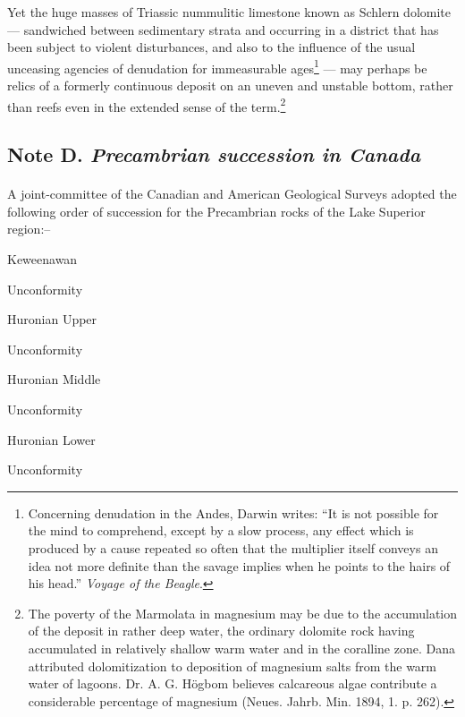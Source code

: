 \documentclass[a4paper, 12pt, oneside, landscape]{article}
\begin{document}
Yet the huge masses of Triassic nummulitic limestone known as Schlern dolomite --- sandwiched between sedimentary strata and occurring in a district that has been subject to violent disturbances, and also to the influence of the usual unceasing agencies of denudation for immeasurable ages\footnote{Concerning denudation in the Andes, Darwin writes: ``It is not possible for the mind to comprehend, except by a slow process, any effect which is produced by a cause repeated so often that the multiplier itself conveys an idea not more definite than the savage implies when he points to the hairs of his head.'' \emph{Voyage of the Beagle}.} --- may perhaps be relics of a formerly continuous deposit on an uneven and unstable bottom, rather than reefs even in the extended sense of the term.\footnote{The poverty of the Marmolata in magnesium may be due to the accumulation of the deposit in rather deep water, the ordinary dolomite rock having accumulated in relatively shallow warm water and in the coralline zone. Dana attributed dolomitization to deposition of magnesium salts from the warm water of lagoons. Dr. A. G. Högbom believes calcareous algae contribute a considerable percentage of magnesium (Neues. Jahrb. Min. 1894, 1. p. 262).}

\subsection{Note D. \emph{Precambrian succession in Canada}}
\paragraph{}
A joint-committee of the Canadian and American Geological Surveys adopted the following order of succession for the Precambrian rocks of the Lake Superior region:--

Keweenawan

\hspace{10mm}Unconformity

Huronian Upper

\hspace{10mm}Unconformity

Huronian Middle

\hspace{10mm}Unconformity

Huronian Lower

\hspace{10mm}Unconformity
\end{document}
